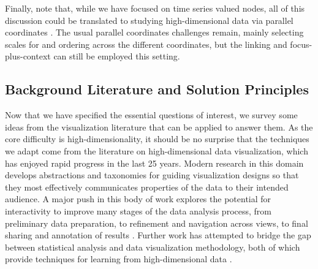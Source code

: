 \documentclass[12pt]{article}
\begin{document}
Finally, note that, while we have focused on time series valued nodes,
all of this discussion could be translated to studying high-dimensional
data via parallel coordinates \citep{inselberg1991parallel}. The usual parallel
coordinates challenges remain, mainly selecting scales for and ordering
across the different coordinates, but the linking and focus-plus-context
can still be employed this setting.

\subsection{Background Literature and Solution
Principles}\label{background-literature-and-solution-principles}

Now that we have specified the essential questions of interest, we survey some
ideas from the visualization literature that can be applied to answer them. As
the core difficulty is high-dimensionality, it should be no surprise that the
techniques we adapt come from the literature on high-dimensional data
visualization, which has enjoyed rapid progress in the last 25 years. Modern
research in this domain develops abstractions and taxonomies for guiding
visualization designs so that they most effectively communicates properties of
the data to their intended audience. A major push in this body of work explores
the potential for interactivity to improve many stages of the data analysis
process, from preliminary data preparation, to refinement and navigation across
views, to final sharing and annotation of results \citep{heer2012taxonomy}.
Further work has attempted to bridge the gap between statistical analysis and
data visualization methodology, both of which provide techniques for learning
from high-dimensional data \citep{de2003visual}.
\end{document}
